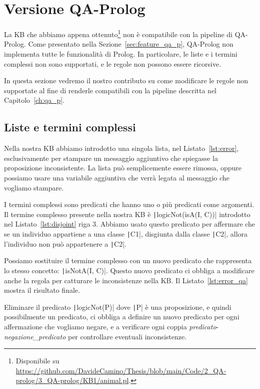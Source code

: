 \section{Versione QA-Prolog}
La KB che abbiamo appena ottenuto\footnote{Disponibile su \url{https://github.com/DavideCamino/Thesis/blob/main/Code/2_QA-prolog/3_QA-prolog/KB1/animal.pl}.} non è compatibile con la pipeline di QA-Prolog. Come presentato nella Sezione~\ref{sec:feature_qa_p}, QA-Prolog non implementa tutte le funzionalità di Prolog. In particolare, le liste e i termini complessi non sono supportati, e le regole non possono essere ricorsive.

In questa sezione vedremo il nostro contributo su come modificare le regole non supportate al fine di renderle compatibili con la pipeline descritta nel Capitolo~\ref{ch:qa_p}.

\subsection{Liste e termini complessi}
Nella nostra KB abbiamo introdotto una singola lista, nel Listato~\ref{lst:error}, esclusivamente per stampare un messaggio aggiuntivo che spiegasse la proposizione inconsistente. La lista può semplicemente essere rimossa, oppure possiamo usare una variabile aggiuntiva che verrà legata al messaggio che vogliamo stampare.

I termini complessi sono predicati che hanno uno o più predicati come argomenti. Il termine complesso presente nella nostra KB è \texttt|logicNot(isA(I, C))| introdotto nel Listato~\ref{lst:disjoint} riga $3$. Abbiamo usato questo predicato per affermare che se un individuo appartiene a una classe \texttt|C1|, disgiunta dalla classe \texttt|C2|, allora l'individuo non può appartenere a \texttt|C2|. 

Possiamo sostituire il termine complesso con un nuovo predicato che rappresenta lo stesso concetto: \texttt|isNotA(I, C)|. Questo nuovo predicato ci obbliga a modificare anche la regola per catturare le inconsistenze nella KB. Il Listato~\ref{lst:error_qa} mostra il risultato finale.

\begin{listingenv}[h]
	\caption{Rimozione di liste e termini complessi}
	\label{lst:error_qa}
\end{listingenv}

Eliminare il predicato \texttt|logicNot(P)| dove \texttt|P| è una proposizione, e quindi possibilmente un predicato, ci obbliga a definire un nuovo predicato per ogni affermazione che vogliamo negare, e a verificare ogni coppia \emph{predicato}-\emph{negazione\_predicato} per controllare eventuali inconsistenze.

